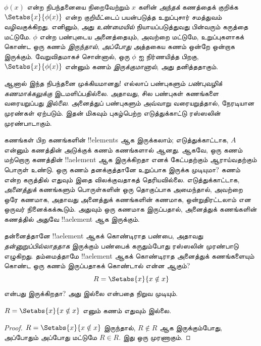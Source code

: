\documentclass[../../../include/open-logic-section]{subfiles}
\begin{document}

$\phi(x)$ என்ற நிபந்தனையை நிறைவேற்றும் $x$ களின் \emph{அந்தக்} கணத்தைக்
குறிக்க $\Setabs{x}{\phi(x)}$ என்ற குறியீட்டைப் பயன்படுத்த
உறுப்புசார் சமத்துவம் வழிவகுக்கிறது. எனினும், அது \emph{உண்மையில்}
நியாயப்படுத்துவது பின்வரும் கருத்தை மட்டுமே.
$\phi$ என்ற பண்புடைய அனைத்தையும், அவற்றை மட்டுமே, உறுப்புகளாகக் கொண்ட
ஒரு கணம் \emph{இருந்தால்}, \emph{அப்போது} அத்தகைய கணம் ஒன்றே ஒன்றாக இருக்கும்.
வேறுவிதமாகச் சொன்னால், ஒரு $\phi$ ஐ நிர்ணயித்த பிறகு,
$\Setabs{x}{\phi(x)}$ என்னும் கணம் \emph{இருக்குமானால்}, அது தனித்ததாகும்.

ஆனால் இந்த நிபந்தனை முக்கியமானது! எல்லாப் பண்புகளும்
\emph{பண்புவழிக் கணமாக்கலுக்கு} இடமளிப்பதில்லை.
அதாவது, சில பண்புகள் கணங்களை வரையறுப்பது \emph{இல்லை}.
அனைத்துப் பண்புகளும் அவ்வாறு வரையறுத்தால், நேரடியான முரண்கள் ஏற்படும்.
இதன் மிகவும் புகழ்பெற்ற எடுத்துக்காட்டு ரஸ்ஸலின் முரண்பாடாகும்.

கணங்கள் பிற கணங்களின் !!{element}s ஆக இருக்கலாம்;
எடுத்துக்காட்டாக, $A$ என்னும் கணத்தின் அடுக்குக் கணம் கணங்களால் ஆனது.
ஆகவே, ஒரு கணம் மற்றொரு கணத்தின் !!a{element} ஆக இருக்கிறதா எனக் கேட்பதற்கும்
ஆராய்வதற்கும் பொருள் உண்டு. ஒரு கணம் தனக்குத்தானே உறுப்பாக இருக்க முடியுமா?
கணம் என்ற கருத்தில் எதுவும் இதை விலக்குவதாகத் தெரியவில்லை.
எடுத்துக்காட்டாக, \emph{அனைத்துக்} கணங்களும் பொருள்களின் ஒரு தொகுப்பாக
அமைந்தால், அவற்றை ஒரே கணமாக, அதாவது அனைத்துக் கணங்களின் கணமாக,
ஒன்றுதிரட்டலாம் என ஒருவர் நினைக்கக்கூடும். அதுவும் ஒரு கணமாக இருப்பதால்,
அனைத்துக் கணங்களின் கணத்தில் அதுவே !!a{element} ஆக இருக்கும்.

தன்னைத்தானே !!a{element} ஆகக் கொண்டிராத பண்பை, அதாவது
\emph{தன்னுறுப்பில்லாததாக} இருக்கும் பண்பைக் கருதும்போது
ரஸ்ஸலின் முரண்பாடு எழுகிறது. தம்மைத்தாமே !!a{element} ஆகக் கொண்டிராத
அனைத்துக் கணங்களையும் கொண்ட ஒரு கணம் இருப்பதாகக் கொண்டால் என்ன ஆகும்?
\[
R = \Setabs{x}{x \notin x}
\]
என்பது இருக்கிறதா? அது இல்லை என்பதை நிறுவ முடியும்.

\begin{thm}[ரஸ்ஸலின் முரண்பாடு]
	$R = \Setabs{x}{x \notin x}$ எனும் கணம் எதுவும் இல்லை.
\end{thm}

\begin{proof}
$R = \Setabs{x}{x \notin x}$ இருந்தால்,
$R \notin R$ ஆக இருக்கும்போது, அப்போதும் அப்போது மட்டுமே $R \in R$.
இது ஒரு முரணாகும்.
\end{proof}
\end{document}
